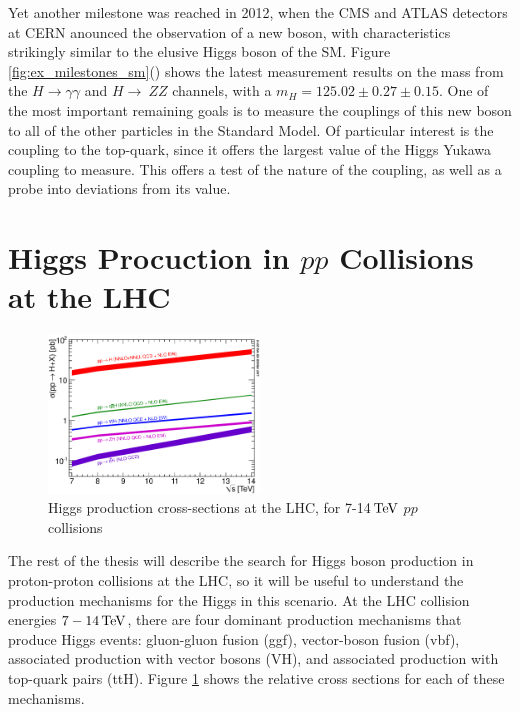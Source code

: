\par Yet another milestone was reached in 2012, when the CMS and ATLAS
detectors at CERN anounced the observation of a new boson, with
characteristics strikingly similar to the elusive Higgs boson of the
SM.  Figure \ref{fig:ex_milestones_sm}() shows
the latest measurement results on the mass from the
$H\rightarrow\gamma\gamma$ and $H\rightarrow~ZZ$ channels, with a
$m_{H} = 125.02 \pm 0.27 \pm 0.15$.  One of the most important
remaining goals is to measure the couplings of this new boson to all
of the other particles in the Standard Model.  Of particular interest
is the coupling to the top-quark, since it offers the largest value of
the Higgs Yukawa coupling to measure.  This offers a test of the
nature of the coupling, as well as a probe into deviations from its
value.   


\section{Higgs Procuction in $pp$ Collisions at the LHC}
\label{higgs_production_overview}

\begin{figure}[h]
   \centering
  \includegraphics[width=0.5\textwidth]{Figures/Experimental_Results/Higgs_XS_7-14TeV.eps}
  \caption{Higgs production cross-sections at the LHC, for 7-14$\,\text{Te\hspace{-.08em}V}$
    $pp$ collisions} \label{fig:Higgs_XS_7-14TeV}
\end{figure}

\par The rest of the thesis will describe the search for Higgs
boson production in proton-proton collisions at the LHC, so it will be
useful to understand the production mechanisms for the Higgs in this
scenario.  At the LHC collision energies $7-14\,\text{Te\hspace{-.08em}V}$, there are four
dominant production mechanisms that produce Higgs events: gluon-gluon
fusion (ggf), vector-boson fusion (vbf), associated production with
vector bosons (VH), and associated production with top-quark pairs (ttH).  Figure
\ref{fig:Higgs_XS_7-14TeV} shows the relative cross sections for each
of these mechanisms.  

